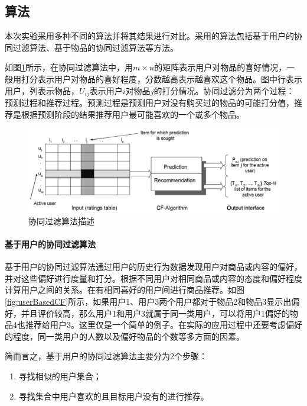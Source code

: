 \documentclass{article}
\begin{document}
\subsection{算法}
\label{sub:suan_fa_}
\par 本次实验采用多种不同的算法并将其结果进行对比。采用的算法包括基于用户的协同过滤算法、基于物品的协同过滤算法等方法。
\par 如图\ref{fig:cf}所示，在协同过滤算法中，用\(m\times n\)的矩阵表示用户对物品的喜好情况，一般用打分表示用户对物品的喜好程度，分数越高表示越喜欢这个物品。图中行表示用户，列表示物品，\(U_{ij}\)表示用户\(i\)对物品\(j\)的打分情况。协同过滤分为两个过程：预测过程和推荐过程。预测过程是预测用户对没有购买过的物品的可能打分值，推荐是根据预测阶段的结果推荐用户最可能喜欢的一个或多个物品。
\begin{figure}[htpb]
    \centering
    \includegraphics[width=0.9\linewidth]{cf.png}
    \caption{协同过滤算法描述}
    \label{fig:cf}
\end{figure}

\paragraph{基于用户的协同过滤算法}
\label{par:ji_yu_yong_hu_de_xie_tong_guo_lu_suan_fa_}
\par 基于用户的协同过滤算法通过用户的历史行为数据发现用户对商品或内容的偏好，并对这些偏好进行度量和打分。根据不同用户对相同商品或内容的态度和偏好程度计算用户之间的关系。在有相同喜好的用户间进行商品推荐。如图\ref{fig:userBasedCF}所示，如果用户1、用户3两个用户都对于物品2和物品3显示出偏好，并且评价较高，那么用户1和用户3就属于同一类用户，可以将用户1偏好的物品4也推荐给用户3。这里仅是一个简单的例子。在实际的应用过程中还要考虑偏好的程度，同一类用户的人数以及偏好物品的个数等多方面的因素。
\par 简而言之，基于用户的协同过滤算法主要分为2个步骤：
\begin{enumerate}
    \item 寻找相似的用户集合；
    \item 寻找集合中用户喜欢的且目标用户没有的进行推荐。
\end{enumerate}
\end{document}
